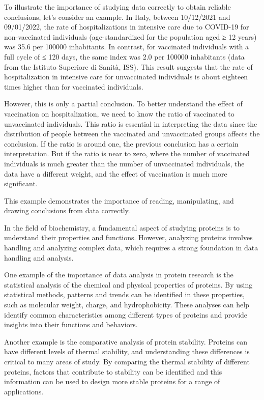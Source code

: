 \documentclass[
  letterpaper,
  DIV=11,
  numbers=noendperiod]{scrreprt}
\begin{document}
To illustrate the importance of studying data correctly to obtain
reliable conclusions, let's consider an example. In Italy, between
10/12/2021 and 09/01/2022, the rate of hospitalizations in intensive
care due to COVID-19 for non-vaccinated individuals (age-standardized
for the population aged ≥ 12 years) was 35.6 per 100000 inhabitants. In
contrast, for vaccinated individuals with a full cycle of ≤ 120 days,
the same index was 2.0 per 100000 inhabitants (data from the Istituto
Superiore di Sanità, ISS). This result suggests that the rate of
hospitalization in intensive care for unvaccinated individuals is about
eighteen times higher than for vaccinated individuals.

However, this is only a partial conclusion. To better understand the
effect of vaccination on hospitalization, we need to know the ratio of
vaccinated to unvaccinated individuals. This ratio is essential in
interpreting the data since the distribution of people between the
vaccinated and unvaccinated groups affects the conclusion. If the ratio
is around one, the previous conclusion has a certain interpretation. But
if the ratio is near to zero, where the number of vaccinated individuals
is much greater than the number of unvaccinated individuals, the data
have a different weight, and the effect of vaccination is much more
significant.

This example demonstrates the importance of reading, manipulating, and
drawing conclusions from data correctly.

In the field of biochemistry, a fundamental aspect of studying proteins
is to understand their properties and functions. However, analyzing
proteins involves handling and analyzing complex data, which requires a
strong foundation in data handling and analysis.

One example of the importance of data analysis in protein research is
the statistical analysis of the chemical and physical properties of
proteins. By using statistical methods, patterns and trends can be
identified in these properties, such as molecular weight, charge, and
hydrophobicity. These analyses can help identify common characteristics
among different types of proteins and provide insights into their
functions and behaviors.

Another example is the comparative analysis of protein stability.
Proteins can have different levels of thermal stability, and
understanding these differences is critical to many areas of study. By
comparing the thermal stability of different proteins, factors that
contribute to stability can be identified and this information can be
used to design more stable proteins for a range of applications.
\end{document}
